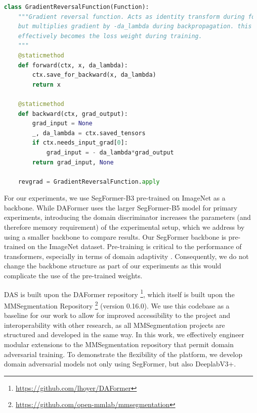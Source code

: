 \documentclass[a4paper,12pt]{report}
\begin{document}
\hspace*{4mm}
\begin{lstlisting}[language=Python, caption=Gradient reversal function implemented in PyTorch. Based on \url{https://github.com/tadeephuy/GradientReversal} \cite{paszke_pytorch_2019}]
class GradientReversalFunction(Function):
    """Gradient reversal function. Acts as identity transform during forward pass, 
    but multiplies gradient by -da_lambda during backpropagation. this means da_lambda 
    effectively becomes the loss weight during training.
    """
    @staticmethod
    def forward(ctx, x, da_lambda):
        ctx.save_for_backward(x, da_lambda)
        return x
    
    @staticmethod
    def backward(ctx, grad_output):
        grad_input = None
        _, da_lambda = ctx.saved_tensors
        if ctx.needs_input_grad[0]:
            grad_input = - da_lambda*grad_output
        return grad_input, None

    revgrad = GradientReversalFunction.apply
\end{lstlisting}

For our experiments, we use SegFormer-B3 \cite{xie_segformer_2021} pre-trained on ImageNet as a backbone. While DAFormer uses the larger SegFormer-B5 model for primary experiments, introducing the domain discriminator increases the parameters (and therefore memory requirement) of the experimental setup, which we address by using a smaller backbone to compare results. Our SegFormer backbone is pre-trained on the ImageNet dataset. Pre-training is critical to the performance of transformers, especially in terms of domain adaptivity \cite{dosovitskiy_image_2021}. Consequently, we do not change the backbone structure as part of our experiments as this would complicate the use of the pre-trained weights.

DAS is built upon the DAFormer \cite{hoyer_daformer_2022} repository \footnote{\url{https://github.com/lhoyer/DAFormer}}, which itself is built upon the MMSegmentation Repository \footnote{\url{https://github.com/open-mmlab/mmsegmentation}} (version 0.16.0). We use this codebase as a baseline for our work to allow for improved accessibility to the project and interoperability with other research, as all MMSegmentation projects are structured and developed in the same way. In this work, we effectively engineer modular extensions to the MMSegmentation repository that permit domain adversarial training. To demonstrate the flexibility of the platform, we develop domain adversarial models not only using SegFormer, but also DeeplabV3+.
\end{document}
